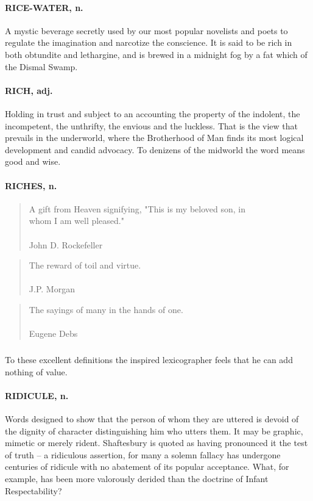 \documentclass[11pt]{article}
\begin{document}
\paragraph{RICE-WATER, n.}  A mystic beverage secretly used by our most popular
novelists and poets to regulate the imagination and narcotize the
conscience.  It is said to be rich in both obtundite and lethargine,
and is brewed in a midnight fog by a fat which of the Dismal Swamp.

\paragraph{RICH, adj.}  Holding in trust and subject to an accounting the property
of the indolent, the incompetent, the unthrifty, the envious and the
luckless.  That is the view that prevails in the underworld, where the
Brotherhood of Man finds its most logical development and candid
advocacy.  To denizens of the midworld the word means good and wise.

\paragraph{RICHES, n.}

\begin{quote}       A gift from Heaven signifying, "This is my beloved son, in \\
  whom I am well pleased." \\
 \\
John D. Rockefeller \end{quote}


\begin{quote}       The reward of toil and virtue. \\
 \\
J.P. Morgan \end{quote}


\begin{quote}       The sayings of many in the hands of one. \\
 \\
Eugene Debs \end{quote}


\subparagraph{}   To these excellent definitions the inspired lexicographer feels
that he can add nothing of value.

\paragraph{RIDICULE, n.}  Words designed to show that the person of whom they are
uttered is devoid of the dignity of character distinguishing him who
utters them.  It may be graphic, mimetic or merely rident.
Shaftesbury is quoted as having pronounced it the test of truth -- a
ridiculous assertion, for many a solemn fallacy has undergone
centuries of ridicule with no abatement of its popular acceptance.
What, for example, has been more valorously derided than the doctrine
of Infant Respectability?
\end{document}
